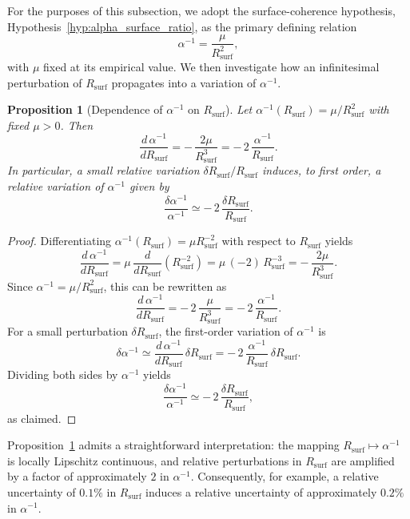 \documentclass[11pt,a4paper]{article}
\theoremstyle{plain}
\newtheorem{proposition}{Proposition}
\theoremstyle{definition}
\theoremstyle{remark}
\begin{document}
For the purposes of this subsection, we adopt the surface-coherence hypothesis, Hypothesis~\ref{hyp:alpha_surface_ratio}, as the primary defining relation
\[
  \alpha^{-1} = \frac{\mu}{R_{\mathrm{surf}}^2},
\]
with \(\mu\) fixed at its empirical value. We then investigate how an infinitesimal perturbation of \(R_{\mathrm{surf}}\) propagates into a variation of \(\alpha^{-1}\).

\begin{proposition}[Dependence of \texorpdfstring{\(\alpha^{-1}\)}{alpha^{-1}} on \texorpdfstring{\(R_{\mathrm{surf}}\)}{R\_surf}]
  \label{prop:sensitivity_Rsurf}
  Let \(\alpha^{-1}(R_{\mathrm{surf}}) = \mu / R_{\mathrm{surf}}^2\) with fixed \(\mu > 0\).
  Then
  \[
    \frac{d\,\alpha^{-1}}{d R_{\mathrm{surf}}}
    = -\,\frac{2\mu}{R_{\mathrm{surf}}^3}
    = -\,2\,\frac{\alpha^{-1}}{R_{\mathrm{surf}}}.
  \]
  In particular, a small relative variation \(\delta R_{\mathrm{surf}} / R_{\mathrm{surf}}\)
  induces, to first order, a relative variation of \(\alpha^{-1}\) given by
  \[
    \frac{\delta \alpha^{-1}}{\alpha^{-1}}
    \simeq -\,2\,\frac{\delta R_{\mathrm{surf}}}{R_{\mathrm{surf}}}.
  \]
\end{proposition}

\begin{proof}
  Differentiating \(\alpha^{-1}(R_{\mathrm{surf}}) = \mu R_{\mathrm{surf}}^{-2}\) with respect
  to \(R_{\mathrm{surf}}\) yields
  \[
    \frac{d\,\alpha^{-1}}{d R_{\mathrm{surf}}}
    = \mu\,\frac{d}{d R_{\mathrm{surf}}} \left( R_{\mathrm{surf}}^{-2} \right)
    = \mu\,(-2)\,R_{\mathrm{surf}}^{-3}
    = -\,\frac{2\mu}{R_{\mathrm{surf}}^3}.
  \]
  Since \(\alpha^{-1} = \mu / R_{\mathrm{surf}}^2\), this can be rewritten as
  \[
    \frac{d\,\alpha^{-1}}{d R_{\mathrm{surf}}}
    = -\,2\,\frac{\mu}{R_{\mathrm{surf}}^3}
    = -\,2\,\frac{\alpha^{-1}}{R_{\mathrm{surf}}}.
  \]
  For a small perturbation \(\delta R_{\mathrm{surf}}\), the first-order variation of
  \(\alpha^{-1}\) is
  \[
    \delta \alpha^{-1}
    \simeq \frac{d\,\alpha^{-1}}{d R_{\mathrm{surf}}}\,\delta R_{\mathrm{surf}}
    = -\,2\,\frac{\alpha^{-1}}{R_{\mathrm{surf}}}\,\delta R_{\mathrm{surf}}.
  \]
  Dividing both sides by \(\alpha^{-1}\) yields
  \[
    \frac{\delta \alpha^{-1}}{\alpha^{-1}}
    \simeq -\,2\,\frac{\delta R_{\mathrm{surf}}}{R_{\mathrm{surf}}},
  \]
  as claimed.
\end{proof}

Proposition~\ref{prop:sensitivity_Rsurf} admits a straightforward interpretation: the mapping
\(R_{\mathrm{surf}} \mapsto \alpha^{-1}\) is locally Lipschitz continuous, and relative perturbations in
\(R_{\mathrm{surf}}\) are amplified by a factor of approximately \(2\) in
\(\alpha^{-1}\). Consequently, for example, a relative uncertainty of \(0.1\%\) in
\(R_{\mathrm{surf}}\) induces a relative uncertainty of approximately \(0.2\%\) in
\(\alpha^{-1}\).
\end{document}
